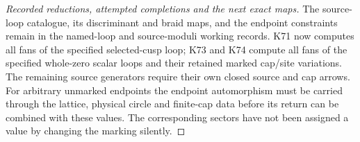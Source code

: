 \begin{proof}[Recorded reductions, attempted completions and the next exact maps]
The source-loop catalogue, its discriminant and braid maps,
and the endpoint constraints remain in the named-loop and
source-moduli working records. K71 now computes all fans of
the specified selected-cusp loop; K73 and K74 compute all
fans of the specified whole-zero scalar loops and their
retained marked cap/site variations. The remaining source
generators require their own closed source and cap arrows.
For arbitrary unmarked endpoints the endpoint automorphism
must be carried through the lattice, physical circle and
finite-cap data before its return can be combined with
these values. The corresponding sectors have not been
assigned a value by changing the marking silently.
\end{proof}
